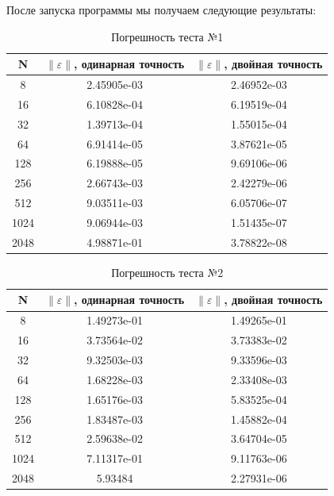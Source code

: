 После запуска программы мы получаем следующие результаты:
  \begin{table}[H]
    \centering
    \begin{tabular}{c | c | c}
      \toprule
      N & $ \left\lVert \varepsilon \right\rVert  $, одинарная точность & $ \left\lVert \varepsilon \right\rVert  $, двойная точность \\
      \midrule
      8 & 2.45905e-03 & 2.46952e-03\\
      16 & 6.10828e-04 & 6.19519e-04\\
      32 & 1.39713e-04 & 1.55015e-04\\
      64 & 6.91414e-05 & 3.87621e-05\\
      128 & 6.19888e-05 & 9.69106e-06\\
      256 & 2.66743e-03 & 2.42279e-06\\
      512 & 9.03511e-03 & 6.05706e-07\\
      1024 & 9.06944e-03 & 1.51435e-07\\
      2048 & 4.98871e-01 & 3.78822e-08\\
      \bottomrule
    \end{tabular}
    \caption{Погрешность теста №1}
  \end{table}

  \begin{table}[H]
    \centering
    \begin{tabular}{c | c | c}
      \toprule
      N & $ \left\lVert \varepsilon \right\rVert  $, одинарная точность & $ \left\lVert \varepsilon \right\rVert  $, двойная точность \\
      \midrule
      8 & 1.49273e-01 & 1.49265e-01\\
      16 & 3.73564e-02 & 3.73383e-02\\
      32 & 9.32503e-03 & 9.33596e-03\\
      64 & 1.68228e-03 & 2.33408e-03\\
      128 & 1.65176e-03 & 5.83525e-04\\
      256 & 1.83487e-03 & 1.45882e-04\\
      512 & 2.59638e-02 & 3.64704e-05\\
      1024 & 7.11317e-01 & 9.11763e-06\\
      2048 & 5.93484 & 2.27931e-06\\
      \bottomrule
    \end{tabular}
    \caption{Погрешность теста №2}
  \end{table}

